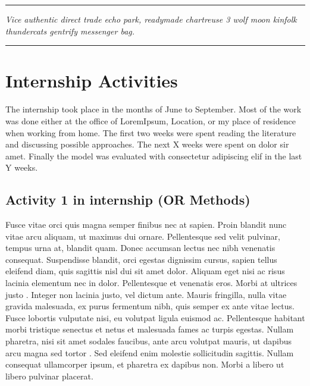 \documentclass[11pt]{article}
\newcommand{\HRule}[1]{\rule{\linewidth}{#1}}
\begin{document}
\par\noindent\rule{\textwidth}{0.4pt}
\begin{center}
    \textit{Vice authentic direct trade echo park, readymade chartreuse 3 wolf moon kinfolk thundercats gentrify messenger bag. 
         }
\end{center}
\par\noindent\rule{\textwidth}{0.4pt}

 

\section{Internship Activities}

The internship took place in the months of June to September. Most of the work was done either at the office of LoremIpsum, Location, or my place of residence when working from home. The first two weeks were spent reading the literature and discussing possible approaches. The next X weeks were spent on dolor sir amet. Finally the model was evaluated with consectetur adipiscing elif in the last Y weeks.

\subsection{Activity 1 in internship (OR Methods)}



 Fusce vitae orci quis magna semper finibus nec at sapien. Proin blandit nunc vitae arcu aliquam, ut maximus dui ornare. Pellentesque sed velit pulvinar, tempus urna at, blandit quam. Donec accumsan lectus nec nibh venenatis consequat. Suspendisse blandit, orci egestas dignissim cursus, sapien tellus eleifend diam, quis sagittis nisl dui sit amet dolor. Aliquam eget nisi ac risus lacinia elementum nec in dolor. Pellentesque et venenatis eros. Morbi at ultrices justo \cite{sechopoulos2021artificial, wang2016discrimination, who_2021}. Integer non lacinia justo, vel dictum ante. Mauris fringilla, nulla vitae gravida malesuada, ex purus fermentum nibh, quis semper ex ante vitae lectus. Fusce lobortis vulputate nisi, eu volutpat ligula euismod ac. Pellentesque habitant morbi tristique senectus et netus et malesuada fames ac turpis egestas. Nullam pharetra, nisi sit amet sodales faucibus, ante arcu volutpat mauris, ut dapibus arcu magna sed tortor \cite{yala2019deep}. Sed eleifend enim molestie sollicitudin sagittis. Nullam consequat ullamcorper ipsum, et pharetra ex dapibus non. Morbi a libero ut libero pulvinar placerat.
\end{document}
